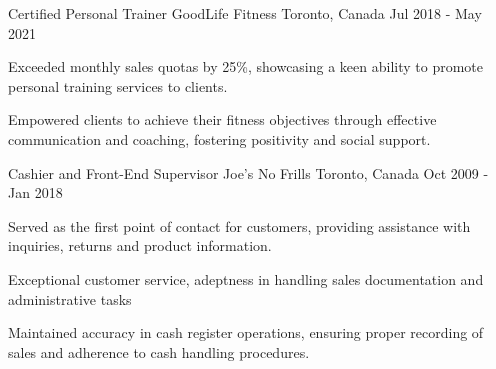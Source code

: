 \begin{cventries}
{\begin{cvitems}
      \end{cvitems}
    }
     \cventry
    {Certified Personal Trainer}
    {GoodLife Fitness}
    {Toronto, Canada}
    {Jul 2018 - May 2021}
    {
      \begin{cvitems}
        \item {Exceeded monthly sales quotas by 25\%, showcasing a keen ability to promote personal training services to clients.}
        \item {Empowered clients to achieve their fitness objectives through effective communication and coaching, fostering positivity and social support.}
      \end{cvitems}
    }
       \cventry
    {Cashier and Front-End Supervisor}
    {Joe's No Frills}
    {Toronto, Canada}
    {Oct 2009 - Jan 2018}
    {
      \begin{cvitems}
        \item {Served as the first point of contact for customers, providing assistance with inquiries, returns and product information.}
        \item {Exceptional customer service, adeptness in handling sales documentation and administrative tasks}
        \item {Maintained accuracy in cash register operations, ensuring proper recording of sales and adherence to cash handling procedures.}
      \end{cvitems}
    }
\end{cventries}